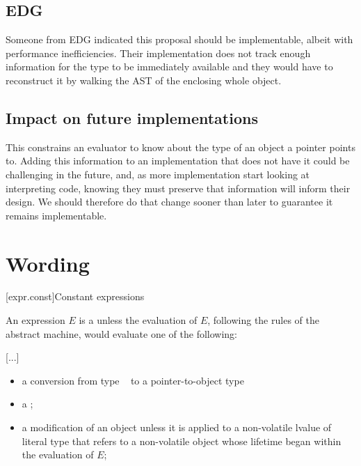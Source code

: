 \documentclass{wg21}
\begin{document}
\subsection{EDG}

Someone from EDG indicated this proposal should be implementable, albeit with performance inefficiencies. Their implementation does not track enough
information for the type to be immediately available and they would have to reconstruct it by walking the AST of the enclosing whole object.


\subsection{Impact on future implementations}

This constrains an evaluator to know about the type of an object a pointer points to.
Adding this information to an implementation that does not have it could be challenging in the future, and, as more implementation start looking at
interpreting  code, knowing they must preserve that information will inform their design. We should therefore do that change sooner than later to guarantee it remains implementable.

\section{Wording}

[expr.const]{Constant expressions}%

\pnum
An expression $E$ is a 
unless the evaluation of $E$, following the rules of the abstract
machine, would evaluate one of the following:

\textcolor{noteclr}{[...]}
\begin{itemize}
\item
a conversion from type ~ to a pointer-to-object type 


\item
a ;

\item
a modification of an object
unless it is applied to a non-volatile lvalue of literal type
that refers to a non-volatile object
whose lifetime began within the evaluation of $E$;

\end{itemize}
\end{document}

